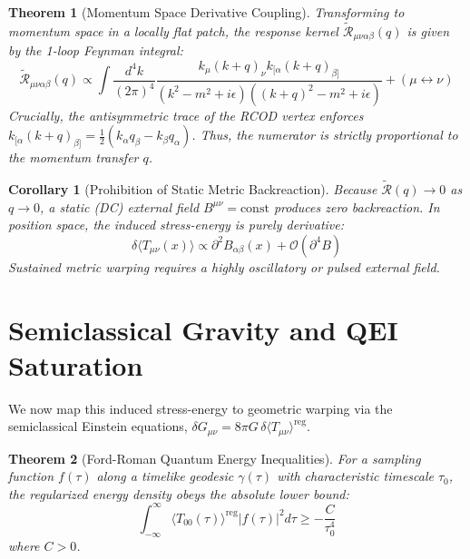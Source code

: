 \documentclass[11pt, a4paper]{article}
\newtheorem{theorem}{Theorem}
\newtheorem{corollary}{Corollary}
\begin{document}
\begin{theorem}[Momentum Space Derivative Coupling]
Transforming to momentum space in a locally flat patch, the response kernel $\tilde{\mathcal{R}}_{\mu\nu\alpha\beta}(q)$ is given by the 1-loop Feynman integral:
\begin{equation}
    \tilde{\mathcal{R}}_{\mu\nu\alpha\beta}(q) \propto \int \frac{d^4k}{(2\pi)^4} \frac{k_\mu (k+q)_\nu k_{[\alpha} (k+q)_{\beta]}}{(k^2 - m^2 + i\epsilon) ((k+q)^2 - m^2 + i\epsilon)} + (\mu \leftrightarrow \nu)
\end{equation}
Crucially, the antisymmetric trace of the RCOD vertex enforces $k_{[\alpha} (k+q)_{\beta]} = \frac{1}{2}(k_\alpha q_\beta - k_\beta q_\alpha)$. Thus, the numerator is strictly proportional to the momentum transfer $q$.
\end{theorem}

\begin{corollary}[Prohibition of Static Metric Backreaction]
Because $\tilde{\mathcal{R}}(q) \to 0$ as $q \to 0$, a static (DC) external field $B^{\mu\nu} = \text{const}$ produces zero backreaction. In position space, the induced stress-energy is purely derivative:
\begin{equation}
    \delta \langle T_{\mu\nu}(x) \rangle \propto \partial^2 B_{\alpha\beta}(x) + \mathcal{O}(\partial^4 B)
\end{equation}
Sustained metric warping requires a highly oscillatory or pulsed external field.
\end{corollary}

\section{Semiclassical Gravity and QEI Saturation}

We now map this induced stress-energy to geometric warping via the semiclassical Einstein equations, $\delta G_{\mu\nu} = 8\pi G \, \delta \langle T_{\mu\nu} \rangle^{\text{reg}}$.

\begin{theorem}[Ford-Roman Quantum Energy Inequalities]
For a sampling function $f(\tau)$ along a timelike geodesic $\gamma(\tau)$ with characteristic timescale $\tau_0$, the regularized energy density obeys the absolute lower bound:
\begin{equation}
    \int_{-\infty}^\infty \langle T_{00}(\tau) \rangle^{\text{reg}} |f(\tau)|^2 d\tau \ge - \frac{C}{\tau_0^4}
\end{equation}
where $C > 0$.
\end{theorem}
\end{document}
